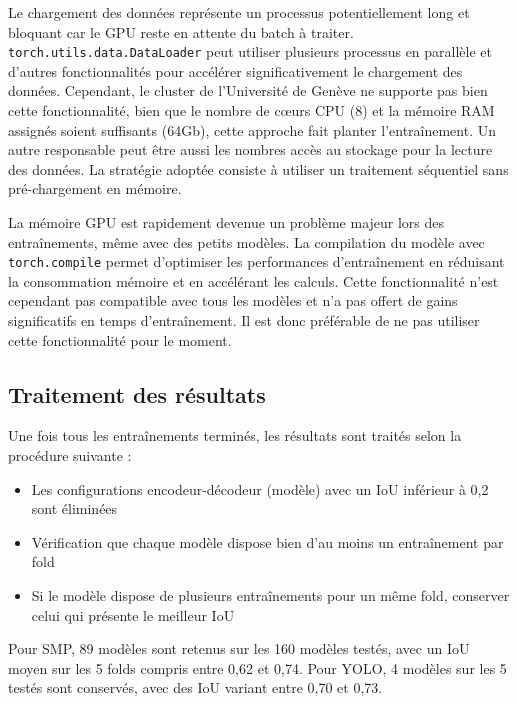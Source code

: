 Le chargement des données représente un processus potentiellement long et bloquant car le GPU reste en attente du batch à traiter. \texttt{torch.utils.data.DataLoader} peut utiliser plusieurs processus en parallèle et d'autres fonctionnalités pour accélérer significativement le chargement des données. Cependant, le cluster de l'Université de Genève ne supporte pas bien cette fonctionnalité, bien que le nombre de cœurs CPU (8) et la mémoire RAM assignés soient suffisants (64Gb), cette approche fait planter l'entraînement. Un autre responsable peut être aussi les nombres accès au stockage pour la lecture des données. La stratégie adoptée consiste à utiliser un traitement séquentiel sans pré-chargement en mémoire.

La mémoire GPU est rapidement devenue un problème majeur lors des entraînements, même avec des petits modèles. La compilation du modèle avec \texttt{torch.compile} permet d'optimiser les performances d'entraînement en réduisant la consommation mémoire et en accélérant les calculs. Cette fonctionnalité n'est cependant pas compatible avec tous les modèles et n'a pas offert de gains significatifs en temps d'entraînement. Il est donc préférable de ne pas utiliser cette fonctionnalité pour le moment.

\subsection{Traitement des résultats}
Une fois tous les entraînements terminés, les résultats sont traités selon la procédure suivante :
\begin{itemize}
    \item Les configurations encodeur-décodeur (modèle) avec un IoU inférieur à 0,2 sont éliminées
    \item Vérification que chaque modèle dispose bien d'au moins un entraînement par fold
    \item Si le modèle dispose de plusieurs entraînements pour un même fold, conserver celui qui présente le meilleur IoU
\end{itemize}

Pour SMP, 89 modèles sont retenus sur les 160 modèles testés, avec un IoU moyen sur les 5 folds compris entre 0,62 et 0,74. Pour YOLO, 4 modèles sur les 5 testés sont conservés, avec des IoU variant entre 0,70 et 0,73.


\newpage
